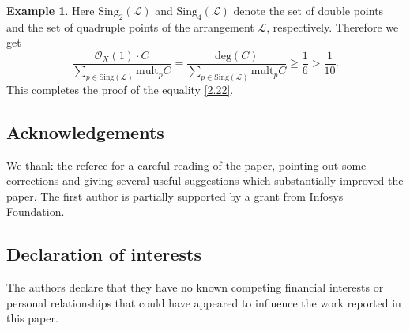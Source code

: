\documentclass[12pt,reqno]{amsart}
\theoremstyle{plain}
\numberwithin{equation}{section}
\theoremstyle{definition}
\newtheorem{example}[theorem]{Example}
\begin{document}
\begin{example}
Here $\text{Sing}_2(\mathcal{L})$ and $\text{Sing}_4(\mathcal{L})$ denote the set of double points and the set of quadruple points of the arrangement $\mathcal{L}$, respectively. Therefore we get 
		\[
		\frac{\mathcal{O}_X(1) \cdot C}{\sum\limits_{p \in \text{Sing}(\mathcal{L})} \text{mult}_{p}C} = \frac{\text{deg}(C)}{ \sum\limits_{p \in\text{Sing}(\mathcal{L})} \text{mult}_{p}C} \geq \frac{1}{6} > \frac{1}{10}.
		\]
		This completes the proof of the equality \eqref{2.22}.

		
		
	\end{example}

 \subsection*{Acknowledgements} We thank the referee for a careful reading of the paper, pointing out some corrections and giving several useful suggestions which substantially improved the paper. The first author is partially supported by a grant from Infosys Foundation. 
	
\subsection*{Declaration of interests}
The authors declare that they have no known competing financial interests or personal relationships
that could have appeared to influence the work reported in this paper. 
		
\end{document}
